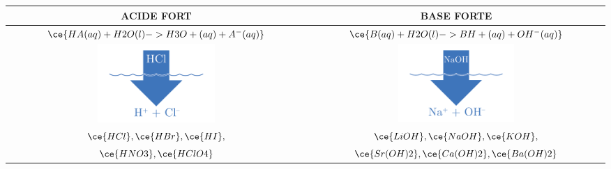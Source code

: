 \documentclass[
  11pt,
  french,
  a4paper,
  openany]{book}
\begin{document}
\begin{longtable}[]{@{}cc@{}}
\toprule
\begin{minipage}[b]{0.48\columnwidth}\centering
ACIDE FORT\strut
\end{minipage} & \begin{minipage}[b]{0.47\columnwidth}\centering
BASE FORTE\strut
\end{minipage}\tabularnewline
\midrule
\endhead
\begin{minipage}[t]{0.48\columnwidth}\centering
\(\ce{HA(aq) + H2O(l) -> H3O+(aq) + A^{-}(aq)}\)\strut
\end{minipage} & \begin{minipage}[t]{0.47\columnwidth}\centering
\(\ce{B(aq) + H2O(l) -> BH+(aq) + OH^{-}(aq)}\)\strut
\end{minipage}\tabularnewline
\begin{minipage}[t]{0.48\columnwidth}\centering
\includegraphics[width=0.4\textwidth,height=\textheight]{images/acides-forts-1.png}\strut
\end{minipage} & \begin{minipage}[t]{0.47\columnwidth}\centering
\includegraphics[width=0.4\textwidth,height=\textheight]{images/bases-fortes-1.png}\strut
\end{minipage}\tabularnewline
\begin{minipage}[t]{0.48\columnwidth}\centering
\(\ce{HCl}, \ce{HBr}, \ce{HI},\)\strut
\end{minipage} & \begin{minipage}[t]{0.47\columnwidth}\centering
\(\ce{LiOH}, \ce{NaOH}, \ce{KOH},\)\strut
\end{minipage}\tabularnewline
\begin{minipage}[t]{0.48\columnwidth}\centering
\(\ce{HNO3}, \ce{HClO4}\)\strut
\end{minipage} & \begin{minipage}[t]{0.47\columnwidth}\centering
\(\ce{Sr(OH)2}, \ce{Ca(OH)2}, \ce{Ba(OH)2}\)\strut
\end{minipage}\tabularnewline
\bottomrule
\end{longtable}
\end{document}
